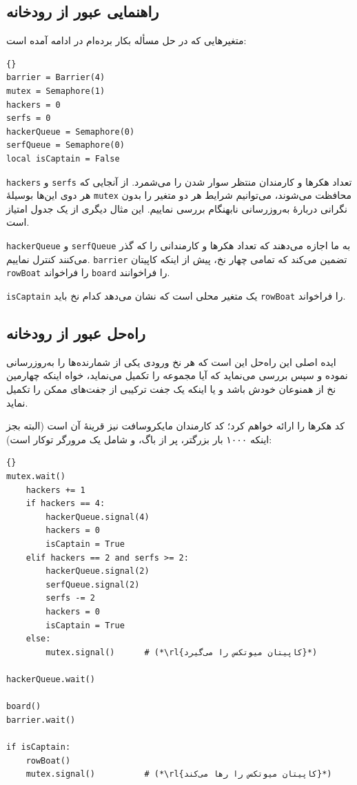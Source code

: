 \documentclass{book}
\newcommand{\clearemptydoublepage}{\newpage\cleardoublepage}
\begin{document}
\clearemptydoublepage
\subsection {راهنمایی عبور از رودخانه}

    متغیرهایی که در حل مسأله بکار برده‌ام در ادامه آمده است:‌

\begin{latin}
\begin{lstlisting}[title=\rl{راهنمایی عبور از رودخانه}]{}
barrier = Barrier(4)
mutex = Semaphore(1)
hackers = 0
serfs = 0
hackerQueue = Semaphore(0)
serfQueue = Semaphore(0)
local isCaptain = False
\end{lstlisting}
\end{latin}

    {\tt hackers} و {\tt serfs}
    تعداد هکرها و کارمندان منتظر سوار شدن را می‌شمرد. از آنجایی که هر دوی این‌ها بوسیلهٔ {\tt mutex} محافظت می‌شوند، می‌توانیم شرایط هر دو متغیر را 
    بدون نگرانی دربارهٔ به‌روزرسانی‌ نابهنگام بررسی نماییم. این مثال دیگری از یک جدول امتیاز است. 

    {\tt hackerQueue} و {\tt serfQueue}
    به ما اجازه می‌دهند که تعداد هکرها و کارمندانی را که گذر می‌کنند کنترل نماییم. {\tt barrier} تضمین می‌کند که تمامی چهار نخ، پیش از اینکه 
    کاپیتان  {\tt rowBoat} را فراخواند  {\tt board}  را فراخوانند. 

    {\tt isCaptain} یک متغیر محلی است که نشان می‌دهد کدام نخ باید {\tt rowBoat} را فراخواند. 

\clearemptydoublepage
\subsection {راه‌حل عبور از رودخانه}

    ایده اصلی این راه‌حل این است که هر نخ ورودی یکی از شمارنده‌ها را به‌روزرسانی نموده و سپس بررسی می‌نماید که آیا مجموعه را تکمیل می‌نماید، خواه 
    اینکه چهارمین نخ از همنوعان خودش باشد و یا اینکه یک جفت ترکیبی از جفت‌‌های ممکن را تکمیل نماید. 

    کد هکرها را ارائه خواهم کرد؛ کد کارمندان مایکروسافت نیز قرینهٔ آن است (البته بجز اینکه ۱۰۰۰ بار بزرگتر، پر از باگ، و شامل یک مرورگر توکار است):

\begin{latin}
\begin{lstlisting}[title=\rl{راه‌حل عبور از رودخانه}]{}
mutex.wait()
    hackers += 1
    if hackers == 4:
        hackerQueue.signal(4)                
	    hackers = 0
	    isCaptain = True
    elif hackers == 2 and serfs >= 2:
        hackerQueue.signal(2)                
        serfQueue.signal(2)                  
	    serfs -= 2
	    hackers = 0
    	isCaptain = True
    else:
        mutex.signal()      # (*\rl{کاپیتان میوتکس را می‌گیرد}*)

hackerQueue.wait()           

board()
barrier.wait()            

if isCaptain:
    rowBoat()
    mutex.signal()          # (*\rl{کاپیتان میوتکس را رها می‌کند}*)
\end{lstlisting}
\end{latin}
\end{document}
